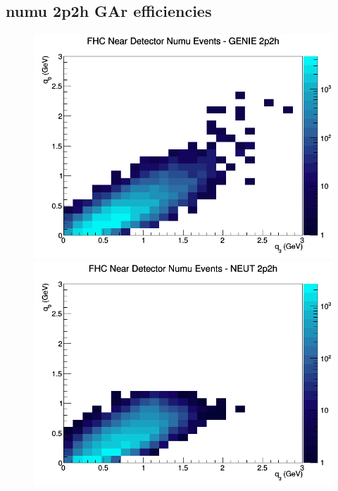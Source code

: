 \subsection{numu 2p2h GAr efficiencies}
\begin{figure}[h]
\includegraphics[width=\linewidth]{eff_q0_q3/GAr/2p2h_FHC_ND_numu_q3_q0_GENIE.png}
\endminipage
{}
\includegraphics[width=\linewidth]{eff_q0_q3/GAr/2p2h_FHC_ND_numu_q3_q0_NEUT.png}
\endminipage
{}

\end{figure}
